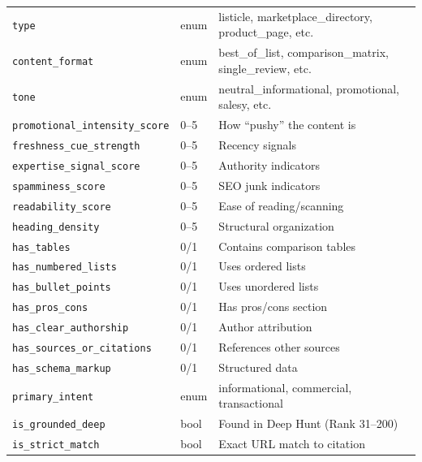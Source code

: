 \begin{longtable}{@{}llp{7.5cm}@{}}
\texttt{type}                        & enum & listicle, marketplace\_directory, product\_page, etc. \\
\texttt{content\_format}             & enum & best\_of\_list, comparison\_matrix, single\_review, etc. \\
\texttt{tone}                        & enum & neutral\_informational, promotional, salesy, etc. \\
\texttt{promotional\_intensity\_score} & 0--5 & How ``pushy'' the content is \\
\texttt{freshness\_cue\_strength}     & 0--5 & Recency signals \\
\texttt{expertise\_signal\_score}     & 0--5 & Authority indicators \\
\texttt{spamminess\_score}           & 0--5 & SEO junk indicators \\
\texttt{readability\_score}          & 0--5 & Ease of reading/scanning \\
\texttt{heading\_density}            & 0--5 & Structural organization \\
\texttt{has\_tables}                 & 0/1  & Contains comparison tables \\
\texttt{has\_numbered\_lists}        & 0/1  & Uses ordered lists \\
\texttt{has\_bullet\_points}         & 0/1  & Uses unordered lists \\
\texttt{has\_pros\_cons}             & 0/1  & Has pros/cons section \\
\texttt{has\_clear\_authorship}      & 0/1  & Author attribution \\
\texttt{has\_sources\_or\_citations} & 0/1  & References other sources \\
\texttt{has\_schema\_markup}         & 0/1  & Structured data \\
\texttt{primary\_intent}             & enum & informational, commercial, transactional \\
\texttt{is\_grounded\_deep}          & bool & Found in Deep Hunt (Rank 31--200) \\
\texttt{is\_strict\_match}           & bool & Exact URL match to citation \\

\end{longtable}

